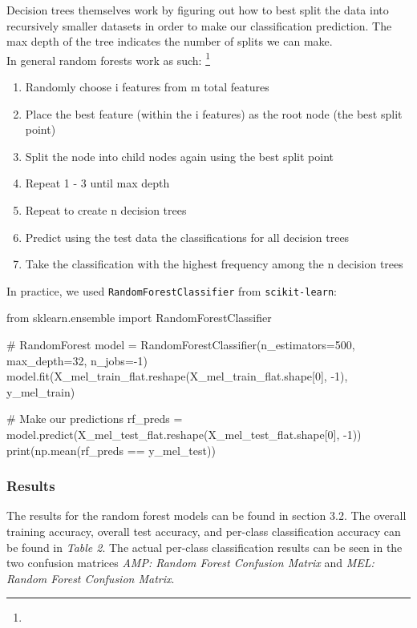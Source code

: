 \documentclass[11pt]{article}
\begin{document}
\noindent Decision trees themselves work by figuring out how to best split the data into recursively smaller datasets in order to make our classification prediction. The max depth of the tree indicates the number of splits we can make.\\

\noindent In general random forests work as such:
\footnote{}
\begin{enumerate}
    \item Randomly choose i features from m total features
    \item Place the best feature (within the i features) as the root node (the best split point)
    \item Split the node into child nodes again using the best split point
    \item Repeat 1 - 3 until max depth
    \item Repeat to create n decision trees
    \item Predict using the test data the classifications for all decision trees
    \item Take the classification with the highest frequency among the n decision trees
\end{enumerate}

\noindent In practice, we used \texttt{RandomForestClassifier} from \texttt{scikit-learn}:

\begin{python}
from sklearn.ensemble import RandomForestClassifier

# RandomForest
model = RandomForestClassifier(n_estimators=500, max_depth=32, n_jobs=-1)
model.fit(X_mel_train_flat.reshape(X_mel_train_flat.shape[0], -1), y_mel_train)

# Make our predictions
rf_preds = model.predict(X_mel_test_flat.reshape(X_mel_test_flat.shape[0], -1))
print(np.mean(rf_preds == y_mel_test))
\end{python}

\subsubsection{Results}
The results for the random forest models can be found in section 3.2. The overall training accuracy, overall test accuracy, and per-class classification accuracy can be found in \textit{Table 2}. The actual per-class classification results can be seen in the two confusion matrices \textit{AMP: Random Forest Confusion Matrix} and \textit{MEL: Random Forest Confusion Matrix}.
\end{document}
